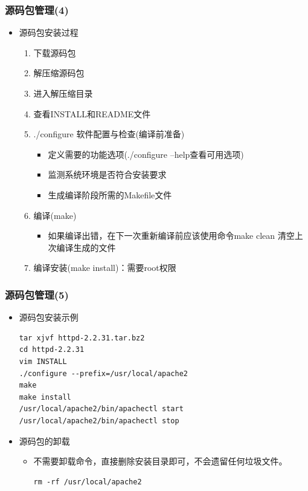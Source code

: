 \documentclass[xcolor=svgnames,presentation]{beamer}
\begin{document}
\begin{frame}
\frametitle{源码包管理(4)}
\label{sec-3-16}
\begin{itemize}

\item 源码包安装过程
\label{sec-3-16-1}%
\begin{enumerate}
\item 下载源码包
\item 解压缩源码包
\item 进入解压缩目录
\item 查看INSTALL和README文件
\item ./configure 软件配置与检查(编译前准备)
\begin{itemize}
\item 定义需要的功能选项(./configure --help查看可用选项)
\item 监测系统环境是否符合安装要求
\item 生成编译阶段所需的Makefile文件
\end{itemize}
\item 编译(make)
\begin{itemize}
\item 如果编译出错，在下一次重新编译前应该使用命令make clean 清空上次编译生成的文件
\end{itemize}
\item 编译安装(make install)：需要root权限
\end{enumerate}
\end{itemize} %
\end{frame}
\begin{frame}[fragile]
\frametitle{源码包管理(5)}
\label{sec-3-17}
\begin{itemize}

\item 源码包安装示例\\
\label{sec-3-17-1}%
\begin{verbatim}
tar xjvf httpd-2.2.31.tar.bz2
cd httpd-2.2.31
vim INSTALL
./configure --prefix=/usr/local/apache2
make
make install
/usr/local/apache2/bin/apachectl start
/usr/local/apache2/bin/apachectl stop
\end{verbatim}

\item 源码包的卸载
\label{sec-3-17-2}%
\begin{itemize}

\item 不需要卸载命令，直接删除安装目录即可，不会遗留任何垃圾文件。\\
\label{sec-3-17-2-1}%
\begin{verbatim}
rm -rf /usr/local/apache2
\end{verbatim}
\end{itemize} %
\end{itemize} %
\end{frame}
\end{document}

